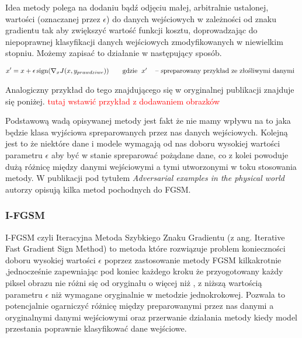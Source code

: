 \documentclass{article}
\newcommand\todo[1]{\textcolor{red}{#1}}
\begin{document}
    Idea metody polega na dodaniu bądź odjęciu małej, arbitralnie ustalonej, wartości (oznaczanej przez \(\epsilon\)) do
    danych wejściowych w zależności od znaku gradientu tak aby zwiększyć wartość funkcji kosztu,
    doprowadzając do niepoprawnej klasyfikacji danych wejściowych zmodyfikowanych w niewielkim stopniu.
    Możemy zapisać to działanie w następujący sposób.

    \begin{equation}
    x' = x + \epsilon\operatorname{sign}(\nabla_{x} J(x, y_{prawdziwe}))
    \qquad\text{gdzie}
    \begin{tabular}[t]{ll}
    $x'$  & -- spreparowany przykład ze złośliwymi danymi \\
    \end{tabular}
    \end{equation}

    Analogiczny przykład do tego znajdującego się w oryginalnej publikacji\cite{harnessing} znajduje się poniżej.
    \todo{tutaj wstawić przykład z dodawaniem obrazków}

    Podstawową wadą opisywanej metody jest fakt że nie mamy wpływu na to jaka będzie klasa wyjściowa
    spreparowanych przez nas danych wejściowych. Kolejną jest to że niektóre dane i modele wymagają od nas
    doboru wysokiej wartości parametru $\epsilon$ aby być w stanie spreparować pożądane dane, co z kolei powoduje dużą
    różnicę między danymi wejściowymi a tymi utworzonymi w toku stosowania metody.
    W publikacji pod tytułem \textit{Adversarial examples in the physical world}\cite{DBLP:journals/corr/KurakinGB16}
    autorzy opisują kilka metod pochodnych do FGSM.

    \subsubsection{I-FGSM}
    I-FGSM czyli Iteracyjna Metoda Szybkiego Znaku Gradientu (z ang. Iterative Fast Gradient Sign Method) to metoda
    które rozwiązuje problem konieczności doboru wysokiej wartości $\epsilon$ poprzez zastosowanie metody FGSM kilkakrotnie
    ,jednocześnie zapewniając pod koniec każdego kroku że przyogotowany każdy piksel obrazu nie różni się od oryginału o więcej
    niż \epsilon, z niższą wartością parametru $\epsilon$ niż wymagane oryginalnie w metodzie jednokrokowej.
    Pozwala to  potencjalnie ogarniczyć różnicę między preparowanymi przez nas danymi a oryginalnymi danymi wejściowymi
    oraz przerwanie działania metody kiedy model przestania poprawnie klasyfikować dane wejściowe.
\end{document}
